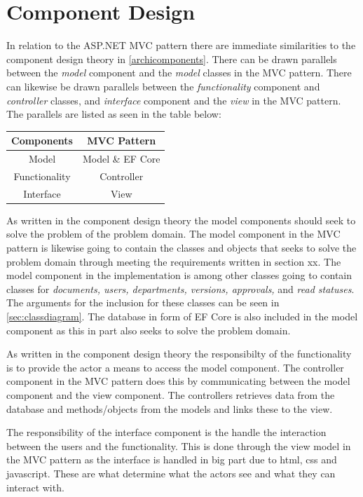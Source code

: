 \section{Component Design}

In relation to the ASP.NET MVC pattern there are immediate similarities to the component design theory in \cref{archicomponents}.
There can be drawn parallels between the \textit{model} component and the \textit{model} classes in the MVC pattern.
There can likewise be drawn parallels between the \textit{functionality} component and \textit{controller} classes, and \textit{interface} component and the \textit{view} in the MVC pattern.
The parallels are listed as seen in the table below:

\begin{center}
	\begin{tabular}{| c | c | }
	\hline
	\textbf{Components} & \textbf{MVC Pattern} \\
	\hline
	Model & Model \& EF Core \\
	\hline
	Functionality & Controller \\
	\hline
	Interface & View \\
	\hline
\end{tabular}
\end{center}

As written in the component design theory the model components should seek to solve the problem of the problem domain.
The model component in the MVC pattern is likewise going to contain the classes and objects that seeks to solve the problem domain through meeting the requirements written in section xx.
The model component in the implementation is among other classes going to contain classes for \textit{documents, users, departments, versions, approvals,} and \textit{read statuses}.
The arguments for the inclusion for these classes can be seen in \cref{sec:classdiagram}.
The database in form of EF Core is also included in the model component as this in part also seeks to solve the problem domain.

As written in the component design theory the responsibilty of the functionality is to provide the actor a means to access the model component.
The controller component in the MVC pattern does this by communicating between the model component and the view component.
The controllers retrieves data from the database and methods/objects from the models and links these to the view.

The responsibility of the interface component is the handle the interaction between the users and the functionality.
This is done through the view model in the MVC pattern as the interface is handled in big part due to html, css and javascript.
These are what determine what the actors see and what they can interact with.

